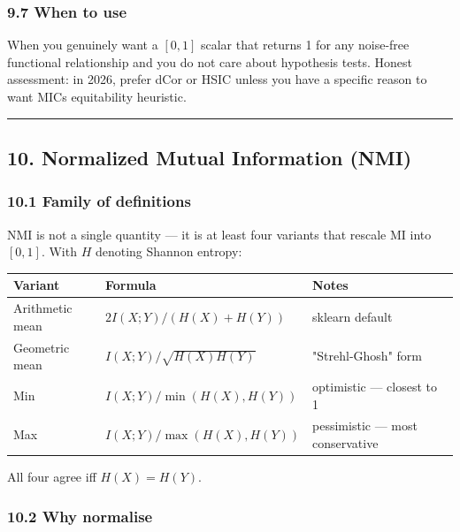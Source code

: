\documentclass{article}
\begin{document}
\subsubsection{9.7 When to use}\label{97-when-to-use}

When you genuinely want a \([0, 1]\) scalar that returns 1 for any
noise-free functional relationship and you do not care about hypothesis
tests. Honest assessment: in 2026, prefer dCor or HSIC unless you have a
specific reason to want MIC\textquotesingle s equitability heuristic.

\begin{center}\rule{0.5\linewidth}{0.5pt}\end{center}

\subsection{10. Normalized Mutual Information
(NMI)}\label{10-normalized-mutual-information-nmi}

\subsubsection{10.1 Family of
definitions}\label{101-family-of-definitions}

NMI is not a single quantity --- it is at least four variants that
rescale MI into \([0, 1]\). With \(H\) denoting Shannon entropy:

{\def\LTcaptype{none} %
\begin{longtable}[]{@{}lll@{}}
\toprule\noalign{}
Variant & Formula & Notes \\
\midrule\noalign{}
\endhead
\bottomrule\noalign{}
\endlastfoot
Arithmetic mean & \(2 I(X;Y) / (H(X) + H(Y))\) & sklearn default \\
Geometric mean & \(I(X;Y) / \sqrt{H(X) H(Y)}\) & "Strehl-Ghosh" form \\
Min & \(I(X;Y) / \min(H(X), H(Y))\) & optimistic --- closest to 1 \\
Max & \(I(X;Y) / \max(H(X), H(Y))\) & pessimistic --- most
conservative \\
\end{longtable}
}

All four agree iff \(H(X) = H(Y)\).

\subsubsection{10.2 Why normalise}\label{102-why-normalise}
\end{document}
